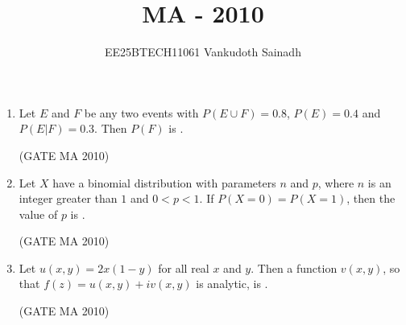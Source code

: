 \documentclass[journal,12pt,onecolumn]{IEEEtran}
\title{\LARGE \textbf{MA - 2010}}
\author{\Large EE25BTECH11061 Vankudoth Sainadh}
\date{}
\theoremstyle{remark}
\begin{document}
\maketitle
\begin{flushleft}
\begin{enumerate}
\item Let $E$ and $F$ be any two events with $P(E \cup F) = 0.8$, $P(E)=0.4$ and $P(E|F)=0.3$. Then $P(F)$ is \underline{\hspace{2cm}}.

\hfill (GATE MA 2010)

\begin{enumerate}
\end{enumerate}

\item Let $X$ have a binomial distribution with parameters $n$ and $p$, where $n$ is an integer greater than $1$ and $0<p<1$. If $P(X=0)=P(X=1)$, then the value of $p$ is \underline{\hspace{2cm}}.

\hfill (GATE MA 2010)

\begin{enumerate}
\end{enumerate}

\item Let $u(x,y)=2x(1-y)$ for all real $x$ and $y$. Then a function $v(x,y)$, so that $f(z)=u(x,y)+iv(x,y)$ is analytic, is \underline{\hspace{2cm}}.

\hfill (GATE MA 2010)

\begin{enumerate}
\end{enumerate}


\end{enumerate}
\end{flushleft}
\end{document}
